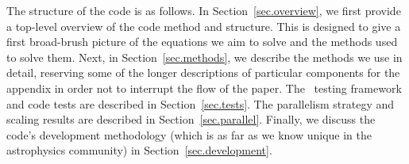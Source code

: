 The structure of the code is as follows.  In Section~\ref{sec.overview}, we first provide a top-level overview of the code method and structure.  This is designed to give a first broad-brush picture of the equations we aim to solve and the methods used to solve them.  Next, in Section~\ref{sec.methods}, we describe the methods we use in detail, reserving some of the longer descriptions of particular components for the appendix in order not to interrupt the flow of the paper.  The \enzo\ testing framework and code tests are described in Section~\ref{sec.tests}.  The parallelism strategy and scaling results are described in Section~\ref{sec.parallel}.  Finally, we discuss the code's development methodology (which is as far as we know unique in the astrophysics community) in Section~\ref{sec.development}.

